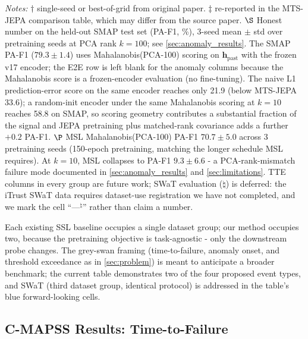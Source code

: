 \documentclass{article}
\newcommand{\h}{\mathbf{h}}
\begin{document}
\begin{table}[t]
\vspace{2pt}
{\footnotesize\raggedright\textit{Notes:} $\dagger$ single-seed or best-of-grid from original paper. $\ddagger$ re-reported in the MTS-JEPA comparison table, which may differ from the source paper. $\S$ Honest number on the held-out SMAP test set (PA-F1, \%), 3-seed mean $\pm$ std over pretraining seeds at PCA rank $k=100$; see \cref{sec:anomaly_results}. The SMAP PA-F1 ($79.3 \pm 1.4$) uses Mahalanobis(PCA-100) scoring on $\h_\text{past}$ with the frozen v17 encoder; the E2E row is left blank for the anomaly columns because the Mahalanobis score is a frozen-encoder evaluation (no fine-tuning). The naive L1 prediction-error score on the same encoder reaches only 21.9 (below MTS-JEPA 33.6); a random-init encoder under the same Mahalanobis scoring at $k=10$ reaches 58.8 on SMAP, so scoring geometry contributes a substantial fraction of the signal and JEPA pretraining plus matched-rank covariance adds a further $+0.2$ PA-F1. $\P$ MSL Mahalanobis(PCA-100) PA-F1 $70.7 \pm 5.0$ across 3 pretraining seeds (150-epoch pretraining, matching the longer schedule MSL requires). At $k=10$, MSL collapses to PA-F1 $9.3 \pm 6.6$ - a PCA-rank-mismatch failure mode documented in \cref{sec:anomaly_results} and \cref{sec:limitations}. TTE columns in every group are future work; SWaT evaluation ($\natural$) is deferred: the iTrust SWaT data requires dataset-use registration we have not completed, and we mark the cell ``---$^\natural$'' rather than claim a number. \par}
\end{table}

Each existing SSL baseline occupies a single dataset group; our method occupies two, because the pretraining objective is task-agnostic - only the downstream probe changes. The grey-swan framing (time-to-failure, anomaly onset, and threshold exceedance as in \cref{sec:problem}) is meant to anticipate a broader benchmark; the current table demonstrates two of the four proposed event types, and SWaT (third dataset group, identical protocol) is addressed in the table's blue forward-looking cells.

\subsection{C-MAPSS Results: Time-to-Failure}
\label{sec:rul_results}
\end{document}
